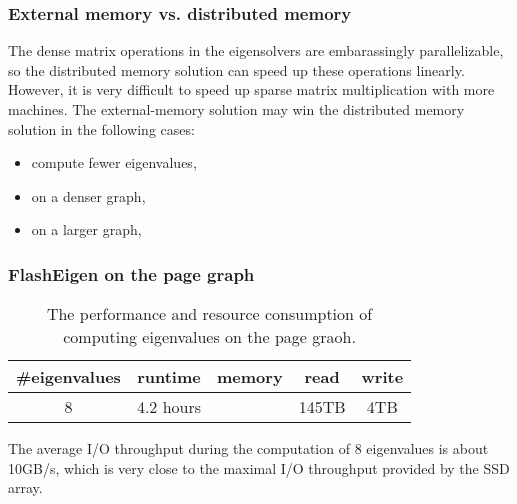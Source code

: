 \subsubsection{External memory vs. distributed memory}

The dense matrix operations in the eigensolvers are embarassingly parallelizable,
so the distributed memory solution can speed up these operations linearly.
However, it is very difficult to speed up sparse matrix multiplication with
more machines.
The external-memory solution may win the distributed memory solution
in the following cases:

\begin{itemize} \itemsep1pt \parskip0pt 
	\item compute fewer eigenvalues,
	\item on a denser graph,
	\item on a larger graph,
\end{itemize}

\subsubsection{FlashEigen on the page graph}

\begin{table}
	\begin{center}
		\small
		\begin{tabular}{|c|c|c|c|c|}
			\hline
			\#eigenvalues & runtime & memory & read & write \\
			\hline
			8 & 4.2 hours & & 145TB & 4TB \\
			\hline
		\end{tabular}
		\normalsize
	\end{center}
	\caption{The performance and resource consumption of computing eigenvalues
	on the page graoh.}
	\label{pg_ev}
\end{table}

The average I/O throughput during the computation of 8 eigenvalues is about
10GB/s, which is very close to the maximal I/O throughput provided by
the SSD array.
